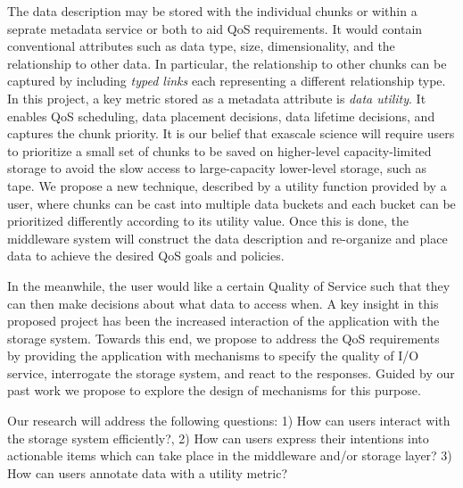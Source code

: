 The data description may be stored with the individual chunks or within a
seprate metadata service or both to aid QoS requirements. It would contain
conventional attributes such as data type, size, dimensionality, and the
relationship to other data. In particular, the relationship to other chunks can
be captured by including \textit{typed links} each representing a different
relationship type.  In this project, a key metric stored as a metadata
attribute is \textit{data utility}.  It enables QoS scheduling, data placement
decisions, data lifetime decisions, and captures the chunk priority. It is
our belief that exascale science will require users to prioritize a small set
of chunks to be saved on higher-level capacity-limited storage to avoid the
slow access to large-capacity lower-level storage, such as tape.  We propose a
new technique, described by a utility function provided by a user, where chunks
can be cast into multiple data buckets and each bucket can be prioritized
differently according to its utility value.  Once this is done, the middleware
system will construct the data description and re-organize and place data to
achieve the desired QoS goals and policies.

In the meanwhile, the user would like a certain Quality of Service such that
they can then make decisions about what data to access when.
A key insight in this proposed project has been the increased interaction of
the application with the storage system. Towards this end, we propose to
address the QoS requirements by providing the application with mechanisms to
specify the quality of I/O service, interrogate the storage system, and react
to the responses. Guided by our past work we propose to explore the design of
mechanisms for this purpose. 

Our research will address the following questions:
1) How can users interact with the storage system efficiently?,
2) How can users express their intentions into actionable items which can take place in the middleware and/or storage layer?
3) How can users annotate data with a utility metric?

